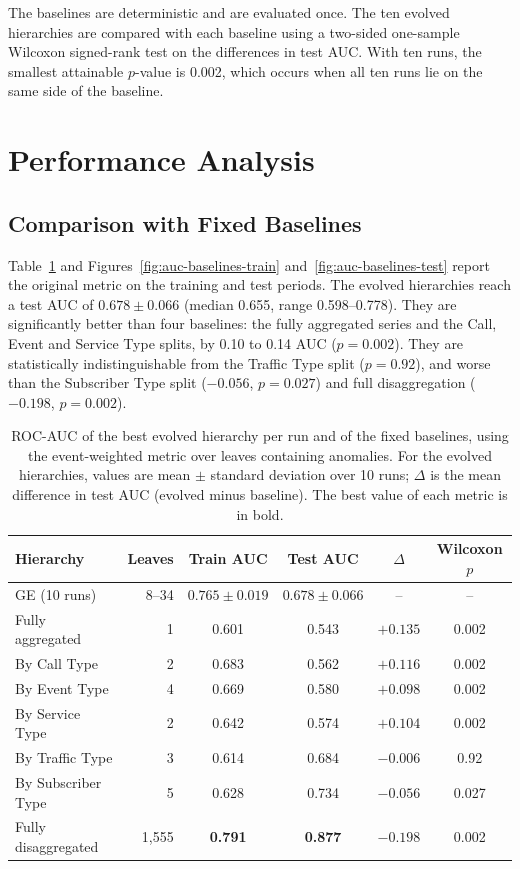The baselines are deterministic and are evaluated once.
The ten evolved hierarchies are compared with each baseline using a two-sided one-sample Wilcoxon signed-rank test on the differences in test \ac{AUC}.
With ten runs, the smallest attainable $p$-value is 0.002, which occurs when all ten runs lie on the same side of the baseline.

\section{Performance Analysis}
\label{sec:performance}

\subsection{Comparison with Fixed Baselines}

Table~\ref{tab:auc-main} and Figures~\ref{fig:auc-baselines-train} and~\ref{fig:auc-baselines-test} report the original metric on the training and test periods.
The evolved hierarchies reach a test \ac{AUC} of $0.678 \pm 0.066$ (median 0.655, range 0.598--0.778).
They are significantly better than four baselines: the fully aggregated series and the Call, Event and Service Type splits, by 0.10 to 0.14 \ac{AUC} ($p = 0.002$).
They are statistically indistinguishable from the Traffic Type split ($p = 0.92$), and worse than the Subscriber Type split ($-0.056$, $p = 0.027$) and full disaggregation ($-0.198$, $p = 0.002$).

\begin{table}[htbp]
    \centering
    \caption[ROC-AUC of evolved hierarchies and fixed baselines (original metric)]{\ac{ROC}-\ac{AUC} of the best evolved hierarchy per run and of the fixed baselines, using the event-weighted metric over leaves containing anomalies. For the evolved hierarchies, values are mean $\pm$ standard deviation over 10 runs; $\Delta$ is the mean difference in test \ac{AUC} (evolved minus baseline). The best value of each metric is in bold.}
    \label{tab:auc-main}
    \begin{tabular}{lrcccc}
        \toprule
        Hierarchy & Leaves & Train AUC & Test AUC & $\Delta$ & Wilcoxon $p$ \\
        \midrule
        GE (10 runs) & 8--34 & $0.765 \pm 0.019$ & $0.678 \pm 0.066$ & -- & -- \\
        Fully aggregated & 1 & 0.601 & 0.543 & $+0.135$ & 0.002 \\
        By Call Type & 2 & 0.683 & 0.562 & $+0.116$ & 0.002 \\
        By Event Type & 4 & 0.669 & 0.580 & $+0.098$ & 0.002 \\
        By Service Type & 2 & 0.642 & 0.574 & $+0.104$ & 0.002 \\
        By Traffic Type & 3 & 0.614 & 0.684 & $-0.006$ & 0.92 \\
        By Subscriber Type & 5 & 0.628 & 0.734 & $-0.056$ & 0.027 \\
        Fully disaggregated & 1{,}555 & \textbf{0.791} & \textbf{0.877} & $-0.198$ & 0.002 \\
        \bottomrule
    \end{tabular}
\end{table}

